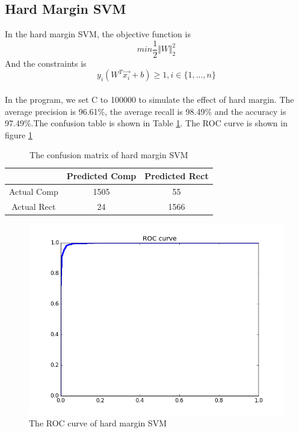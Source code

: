 \documentclass{article}
\begin{document}
\subsection{Hard Margin SVM}
In the hard margin SVM, the objective function is
\begin{equation*}
min \frac{1}{2}\Vert W \Vert _2 ^2
\end{equation*}
And the constraints is
\begin{equation*}
y_i(W^T\overrightarrow{x_i}+b)\geq 1, i\in\lbrace 1, ..., n \rbrace
\end{equation*}
\\
In the program, we set C to 100000 to simulate the effect of hard margin. The average precision is 96.61\%, the average recall is 98.49\% and the accuracy is 97.49\%.The confusion table is shown in Table \ref{tb:confu}. The ROC curve  is shown in figure \ref{fig:roc}
\begin{table}
\begin{center}
\caption{The confusion matrix of hard margin SVM}
\label{tb:confu}
\begin{tabular}{|c|c|c|}
\hline
& Predicted Comp& Predicted Rect\\
\hline
Actual Comp&1505&55\\
\hline
Actual Rect&24&1566\\
\hline 	
\end{tabular}
\end{center}
\end{table}

\begin{figure}[htbp]
\centering
\includegraphics[width=.6\textwidth]{roc_hard.png}
\caption{The ROC curve of hard margin SVM}
\label{fig:roc}
\end{figure}
\end{document}
